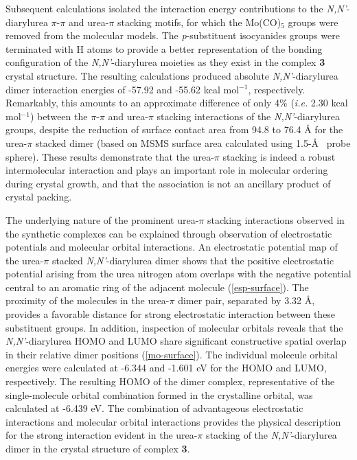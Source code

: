  Subsequent calculations isolated the interaction energy contributions to the \textit{N,N'}-diarylurea $\pi$-$\pi$ and urea-$\pi$ stacking motifs, for which the Mo(CO)$_{5}$ groups were removed from the molecular models. The \textit{p}-substituent isocyanides groups were terminated with H atoms to provide a better representation of the bonding configuration of the \textit{N,N'}-diarylurea moieties as they exist in the complex \textbf{3} crystal structure. The resulting calculations produced absolute \textit{N,N'}-diarylurea dimer interaction energies of -57.92 and -55.62 kcal mol$^{-1}$, respectively. Remarkably, this amounts to an approximate difference of only 4\% (\textit{i.e.} 2.30 kcal mol$^{-1}$) between the $\pi$-$\pi$ and urea-$\pi$ stacking interactions of the \textit{N,N'}-diarylurea groups, despite the reduction of surface contact area from 94.8 to 76.4 \AA \citep{Desiraju2007a, Desiraju2013a, Mukherjee2015a, Corpinot2019a} for the urea-$\pi$ stacked dimer (based on MSMS surface area calculated using 1.5-\AA~ probe sphere). These results demonstrate that the urea-$\pi$ stacking is indeed a robust intermolecular interaction and plays an important role in molecular ordering during crystal growth, and that the association is not an ancillary product of crystal packing.
 
The underlying nature of the prominent urea-$\pi$ stacking interactions observed in the synthetic complexes can be explained through observation of electrostatic potentials and molecular orbital interactions. An electrostatic potential map of the urea-$\pi$ stacked \textit{N,N'}-diarylurea dimer shows that the positive electrostatic potential arising from the urea nitrogen atom overlaps with the negative potential central to an aromatic ring of the adjacent molecule (\autoref{esp-surface}). The proximity of the molecules in the urea-$\pi$ dimer pair, separated by 3.32 \AA, provides a favorable distance for strong electrostatic interaction between these substituent groups. In addition, inspection of molecular orbitals reveals that the \textit{N,N'}-diarylurea HOMO and LUMO share significant constructive spatial overlap in their relative dimer positions (\autoref{mo-surface}). The individual molecule orbital energies were calculated at -6.344 and -1.601 eV for the HOMO and LUMO, respectively. The resulting HOMO of the dimer complex, representative of the single-molecule orbital combination formed in the crystalline orbital, was calculated at -6.439 eV. The combination of advantageous electrostatic interactions and molecular orbital interactions provides the physical description for the strong interaction evident in the urea-$\pi$ stacking of the \textit{N,N'}-diarylurea dimer in the crystal structure of complex \textbf{3}. 

